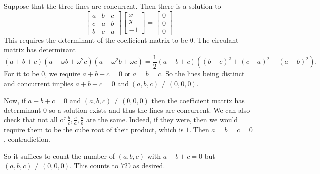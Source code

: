 Suppose that the three lines are concurrent. Then there is a solution to
\[
	\begin{bmatrix}
		a & b & c \\
		c & a & b \\
		b & c & a
	\end{bmatrix}
	\begin{bmatrix} x \\ y \\ -1 \end{bmatrix}
	=
	\begin{bmatrix} 0 \\ 0 \\ 0 \end{bmatrix}
\]
This requires the determinant of the coefficient matrix to be $0$. The circulant matrix has determinant
\[
	(a+b+c)(a+\omega b+\omega^2c)(a+\omega^2b+\omega c)=\frac{1}{2}(a+b+c)((b-c)^2+(c-a)^2+(a-b)^2).
\]
For it to be $0$, we require $a+b+c=0$ or $a=b=c$. So the lines being distinct and concurrent implies $a+b+c=0$ and $(a,b,c)\neq(0,0,0)$.

Now, if $a+b+c=0$ and $(a,b,c)\neq(0,0,0)$ then the coefficient matrix has determinant $0$ so a solution exists and thus the lines are concurrent. We can also check that not all of $\frac{b}{c},\frac{c}{a},\frac{a}{b}$ are the same. Indeed, if they were, then we would require them to be the cube root of their product, which is $1$. Then $a=b=c=0$, contradiction.

So it suffices to count the number of $(a,b,c)$ with $a+b+c=0$ but $(a,b,c)\neq(0,0,0)$. This counts to $\boxed{720}$ as desired.